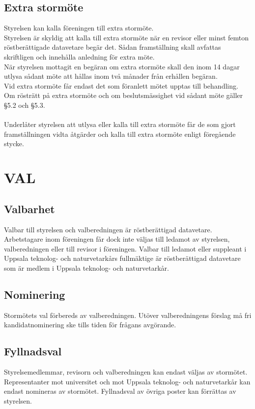 \documentclass[a4paper]{article}
\begin{document}
{{  \subsection{Extra stormöte}
  Styrelsen kan kalla föreningen till extra stormöte.\\
  Styrelsen är skyldig att kalla till extra stormöte när en revisor eller minst femton röstberättigade datavetare begär det. Sådan framställning skall avfattas skriftligen och innehålla anledning för extra möte.\\
  När styrelsen mottagit en begäran om extra stormöte skall den inom 14 dagar utlysa sådant möte att hållas inom två månader från erhållen begäran.\\
  Vid extra stormöte får endast det som föranlett mötet upptas till behandling.\\
  Om rösträtt på extra stormöte och om beslutsmässighet vid sådant möte gäller §5.2 och §5.3.\\
  \\
  Underlåter styrelsen att utlysa eller kalla till extra stormöte får de som gjort framställningen vidta åtgärder och kalla till extra stormöte enligt föregående stycke.}
\section{VAL}
{\subsection{Valbarhet}
  Valbar till styrelsen och valberedningen är röstberättigad datavetare. Arbetstagare inom föreningen får dock inte väljas till ledamot av styrelsen, valberedningen eller till revisor i föreningen. Valbar till ledamot eller suppleant i Uppsala
  teknolog- och naturvetarkårs fullmäktige är röstberättigad datavetare som är medlem i Uppsala teknolog- och naturvetarkår.
  \subsection{Nominering}
  Stormötets val förbereds av valberedningen. Utöver valberedningens förslag må fri kandidatnominering ske tills tiden för frågans avgörande.
  \subsection{Fyllnadsval}
  Styrelsemedlemmar, revisorn och valberedningen kan endast väljas av stormötet. Representanter mot universitet och mot Uppsala teknolog- och naturvetarkår kan endast nomineras av stormötet. Fyllnadsval av övriga poster kan förrättas av styrelsen.
}}
\end{document}
